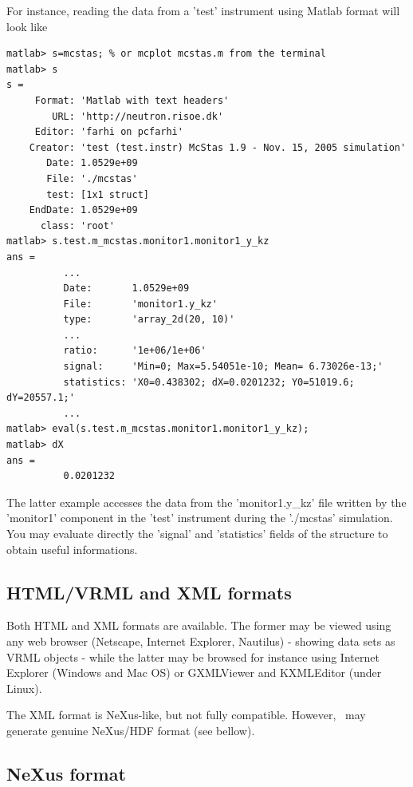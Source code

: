 For instance, reading the data from a 'test' instrument using Matlab format will look like
\begin{verbatim}
matlab> s=mcstas; % or mcplot mcstas.m from the terminal
matlab> s
s =
     Format: 'Matlab with text headers'
        URL: 'http://neutron.risoe.dk'
     Editor: 'farhi on pcfarhi'
    Creator: 'test (test.instr) McStas 1.9 - Nov. 15, 2005 simulation'
       Date: 1.0529e+09
       File: './mcstas'
       test: [1x1 struct]
    EndDate: 1.0529e+09
      class: 'root'
matlab> s.test.m_mcstas.monitor1.monitor1_y_kz
ans =
          ...
          Date:       1.0529e+09
          File:       'monitor1.y_kz'
          type:       'array_2d(20, 10)'
          ...
          ratio:      '1e+06/1e+06'
          signal:     'Min=0; Max=5.54051e-10; Mean= 6.73026e-13;'
          statistics: 'X0=0.438302; dX=0.0201232; Y0=51019.6; dY=20557.1;'
          ...
matlab> eval(s.test.m_mcstas.monitor1.monitor1_y_kz);
matlab> dX
ans =
          0.0201232
\end{verbatim}
The latter example accesses the data from the 'monitor1.y\_kz' file written by the 'monitor1' component in the 'test' instrument during the './mcstas' simulation. You may evaluate directly the 'signal' and 'statistics' fields of the structure to obtain useful informations.

\subsection{HTML/VRML and XML formats}
  

Both HTML and XML formats are available. The former may be viewed using any web browser (Netscape, Internet Explorer, Nautilus) - showing data sets as VRML objects - while the latter may be browsed for instance using Internet Explorer (Windows and Mac OS) or GXMLViewer and KXMLEditor (under Linux).

The XML format is NeXus-like, but not fully compatible. However, \MCS\ may generate genuine NeXus/HDF format (see bellow).

\subsection{NeXus format}
  
\label{r:nexus}

